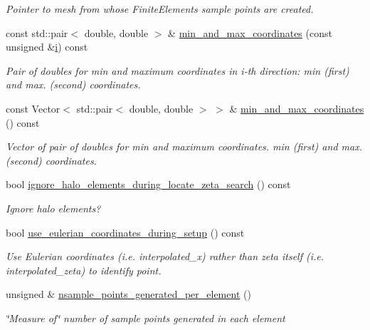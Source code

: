 \begin{DoxyCompactItemize}
\begin{DoxyCompactList}\small\item\em Pointer to mesh from whose Finite\+Elements sample points are created. \end{DoxyCompactList}\item 
const std\+::pair$<$ double, double $>$ \& \hyperlink{classSamplePointContainer_a6799027f7c569176934457b17bfddf0f}{min\+\_\+and\+\_\+max\+\_\+coordinates} (const unsigned \&\hyperlink{cfortran_8h_adb50e893b86b3e55e751a42eab3cba82}{i}) const
\begin{DoxyCompactList}\small\item\em Pair of doubles for min and maximum coordinates in i-\/th direction\+: min (first) and max. (second) coordinates. \end{DoxyCompactList}\item 
const Vector$<$ std\+::pair$<$ double, double $>$ $>$ \& \hyperlink{classSamplePointContainer_a6aaae3b3713a9b1d53182d58fc6050df}{min\+\_\+and\+\_\+max\+\_\+coordinates} () const
\begin{DoxyCompactList}\small\item\em Vector of pair of doubles for min and maximum coordinates. min (first) and max. (second) coordinates. \end{DoxyCompactList}\item 
bool \hyperlink{classSamplePointContainer_a399d246c1afdfd993ceb80e6f2de1400}{ignore\+\_\+halo\+\_\+elements\+\_\+during\+\_\+locate\+\_\+zeta\+\_\+search} () const
\begin{DoxyCompactList}\small\item\em Ignore halo elements? \end{DoxyCompactList}\item 
bool \hyperlink{classSamplePointContainer_a6b6b42a9e6bd8f116af8699e03a78d44}{use\+\_\+eulerian\+\_\+coordinates\+\_\+during\+\_\+setup} () const
\begin{DoxyCompactList}\small\item\em Use Eulerian coordinates (i.\+e. interpolated\+\_\+x) rather than zeta itself (i.\+e. interpolated\+\_\+zeta) to identify point. \end{DoxyCompactList}\item 
unsigned \& \hyperlink{classSamplePointContainer_a48e5ae762e0d56f67645ce4e7dd886d7}{nsample\+\_\+points\+\_\+generated\+\_\+per\+\_\+element} ()
\begin{DoxyCompactList}\small\item\em \char`\"{}\+Measure of\char`\"{} number of sample points generated in each element \end{DoxyCompactList}\item 

\end{DoxyCompactItemize}
